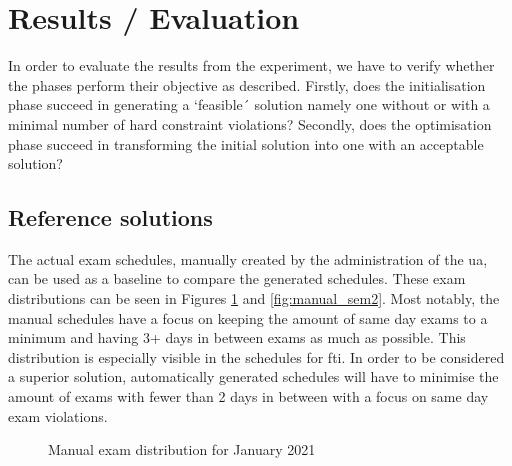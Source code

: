 
\section{Results / Evaluation}\label{sec:results}

In order to evaluate the results from the experiment, we have to verify whether the phases perform their objective as described. Firstly, does the initialisation phase succeed in generating a `feasible´ solution namely one without or with a minimal number of hard constraint violations? Secondly, does the optimisation phase succeed in transforming the initial solution into one with an acceptable solution?

\subsection{Reference solutions}

The actual exam schedules, manually created by the administration of the \acrlong{ua}, can be used as a baseline to compare the generated schedules. These exam distributions can be seen in Figures \ref{fig:manual_sem1} and \ref{fig:manual_sem2}. Most notably, the manual schedules have a focus on keeping the amount of same day exams to a minimum and having 3+ days in between exams as much as possible. This distribution is especially visible in the schedules for \acrshort{fti}. In order to be considered a superior solution, automatically generated schedules will have to minimise the amount of exams with fewer than 2 days in between with a focus on same day exam violations.

\begin{figure}[h]
  \centering
  \hfill
  \caption{Manual exam distribution for January 2021}
  \label{fig:manual_sem1}
\end{figure}

